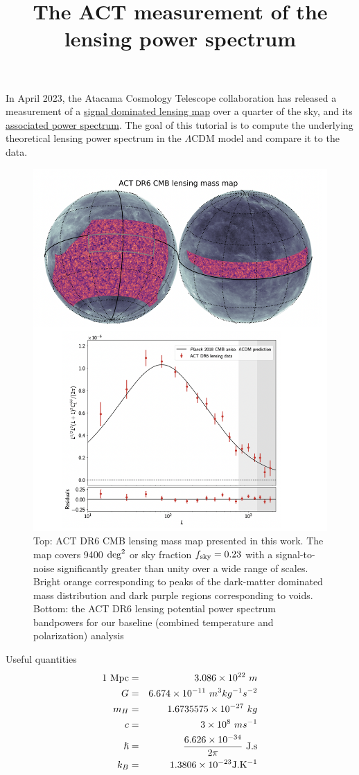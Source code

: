 \documentclass[a4paper, 11pt]{article}
\title{The ACT measurement of the lensing power spectrum}
\def\ba{\begin{eqnarray}}
\def\ea{\end{eqnarray}}
\begin{document}
\maketitle

In April 2023, the Atacama Cosmology Telescope collaboration has released a measurement of a \href{https://arxiv.org/abs/2304.05203}{signal dominated lensing map} over a quarter of the sky, and its \href{https://arxiv.org/abs/2304.05202}{associated power spectrum}. The goal of this tutorial is to compute 
the underlying theoretical lensing power spectrum in the $\Lambda$CDM model and compare it to the data.

\begin{figure}[h!]
  \centering
  \includegraphics[width=0.7\columnwidth]{lensing_dr6.png}
  \caption{Top: ACT DR6 CMB lensing mass map presented in this work. The map covers 9400 ${\rm deg}^{2}$
or sky fraction $f_{\rm sky} = 0.23$ with a signal-to-noise significantly greater than unity over a wide range of scales. Bright orange corresponding to peaks of the dark-matter dominated mass distribution and
dark purple regions corresponding to voids. Bottom: the ACT DR6 lensing potential power spectrum bandpowers for our baseline (combined temperature and polarization) analysis}
  \label{fig:dr6_lensing}
\end{figure}



Useful quantities
\ba
1 \ \rm{Mpc} &=& 3.086 \times 10^{22} \ m \nonumber \\
G &=& 6.674 \times 10^{-11}  \  m^{3} kg^{-1} s^{-2} \nonumber \\
m_{H} &=& 1.6735575  \times10^{-27}  \ kg\nonumber \\
c &=& 3 \times 10^{8} \ m s^{-1} \nonumber \\
\hslash &=& \frac{ 6.626 \times 10^{-34}}{ 2\pi}  \  \rm J . s \nonumber \\
k_{B} &=&  1.3806 \times 10^{-23} \rm J.K^{-1}
\ea
\end{document}
